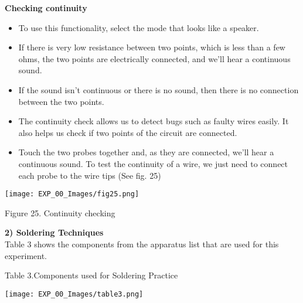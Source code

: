 \documentclass[12pt,a4paper]{article}
\begin{document}
\begin{justify}
\noindent \textbf{Checking continuity}
\vspace{-4mm}
\begin{itemize}
 \setlength\itemsep{-0.3em}
\item To use this functionality, select the mode that looks like a speaker. 
\item If there is very low resistance between two points, which is less than a few ohms, the two points are electrically connected, and we'll hear a continuous sound.
\item If the sound isn't continuous or there is no sound, then there is no connection between the two points.
\item The continuity check allows us to detect bugs such as faulty wires easily. It also helps us check if two points of the circuit are connected.
\item Touch the two probes together and, as they are connected, we'll hear a continuous sound. To test the continuity of a wire, we just need to connect each probe to the wire tips (See fig. 25)

\end{itemize}

\begin{center} 
\texttt{[image: EXP\_00\_Images/fig25.png]}
\end{center}
\vspace{-8mm}
\begin{center} {Figure 25. Continuity checking}\end{center}
\vspace{3cm}
\noindent\textbf{2) Soldering Techniques}\\[3pt]
Table 3 shows the components from the apparatus list that are used for this experiment.
\vspace{-3mm}
\begin{center} {Table 3.Components used for Soldering Practice}\end{center}
\vspace{-10mm}
\begin{center} 
\texttt{[image: EXP\_00\_Images/table3.png]}
\end{center}


\end{justify}
\end{document}
